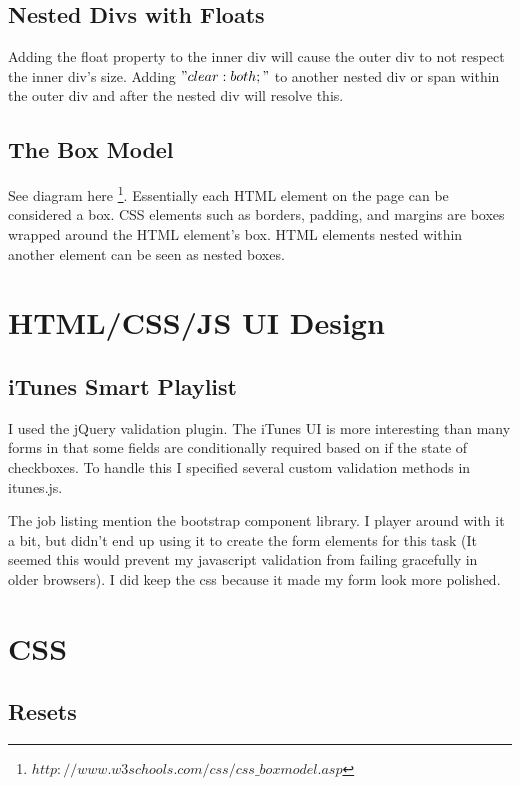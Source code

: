 \documentclass[12pt]{amsart}
\begin{document}
\subsection{Nested Divs with Floats}

Adding the float property to the inner div will cause the outer div to not respect the inner div's size. Adding $"clear:both;"$ to another nested div or span within the outer div and after the nested div will resolve this.


\subsection{The Box Model}

See diagram here \footnote[5]{$http://www.w3schools.com/css/css\_boxmodel.asp$}. Essentially each HTML element on the page can be considered a box. CSS elements such as borders, padding, and margins are boxes wrapped around the HTML element's box. HTML elements nested within another element can be seen as nested boxes.



\section{HTML/CSS/JS UI Design}


\subsection{iTunes Smart Playlist}

I used the jQuery validation plugin. The iTunes UI is more interesting than many forms in that some fields are conditionally required based on if the state of checkboxes. To handle this I specified several custom validation methods in itunes.js.

The job listing mention the bootstrap component library. I player around with it a bit, but didn't end up using it to create the form elements for this task (It seemed this would prevent my javascript validation from failing gracefully in older browsers). I did keep the css because it made my form look more polished.

\section{CSS}

\subsection{Resets}
\end{document}
